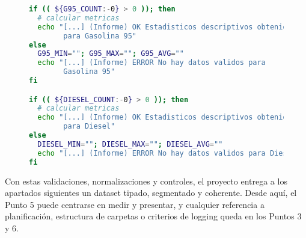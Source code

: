 \begin{figure}[H]
  \begin{lstlisting}[language=bash, caption={Figura 4.5 — Guardarraíl para conjuntos vacíos}]
if (( ${G95_COUNT:-0} > 0 )); then
  # calcular metricas
  echo "[...] (Informe) OK Estadisticos descriptivos obtenidos 
        para Gasolina 95"
else
  G95_MIN=""; G95_MAX=""; G95_AVG=""
  echo "[...] (Informe) ERROR No hay datos validos para 
        Gasolina 95"
fi

if (( ${DIESEL_COUNT:-0} > 0 )); then
  # calcular metricas
  echo "[...] (Informe) OK Estadisticos descriptivos obtenidos 
        para Diesel"
else
  DIESEL_MIN=""; DIESEL_MAX=""; DIESEL_AVG=""
  echo "[...] (Informe) ERROR No hay datos validos para Diesel"
fi
\end{lstlisting}
\end{figure}

Con estas validaciones, normalizaciones y controles, el proyecto entrega a los apartados siguientes un dataset tipado, segmentado y coherente. Desde aquí, el Punto 5 puede centrarse en medir y presentar, y cualquier referencia a planificación, estructura de carpetas o criterios de logging queda en los Puntos 3 y 6.
